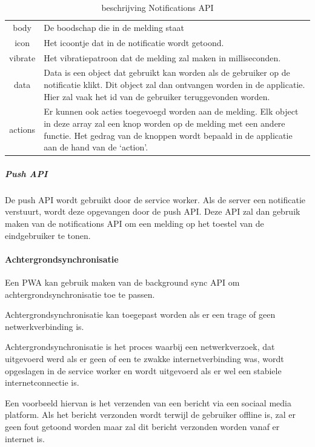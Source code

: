 			\begin{table}[H]
				\centering
				\begin{tabular}{cp{12cm}}
			       body & De boodschap die in de melding staat  \\
			       icon & Het icoontje dat in de notificatie wordt getoond. \\
			       vibrate & Het vibratiepatroon dat de melding zal maken in milliseconden. \\
			       data & Data is een object dat gebruikt kan worden als de gebruiker op de notificatie  klikt. Dit object zal dan ontvangen worden in de applicatie. Hier zal vaak het id van de gebruiker teruggevonden worden. \\
			       actions & Er kunnen ook acties toegevoegd worden aan de melding. Elk object in deze array zal een knop worden op de melding met een andere functie. Het gedrag van de knoppen wordt bepaald in de applicatie aan de hand van de ‘action’. \\
				\end{tabular}	
				\caption{beschrijving Notifications API}
			\end{table}
			\autocite{Developers2019}
			\autocite{Mozilla2019a}
		
		
		\subparagraph{Push API}
		
			De push API wordt gebruikt door de service worker. Als de server een notificatie verstuurt, wordt deze opgevangen door de push API. Deze API zal dan gebruik maken van de notifications API om een melding op het toestel van de eindgebruiker te tonen.
			\autocite{Mozilla2019b}
			\autocite{Gaunt2020}
	
	\paragraph{Achtergrondsynchronisatie }
		Een PWA kan gebruik maken van de background sync API om achtergrondsynchronisatie toe te passen.
		
		Achtergrondsynchronisatie kan toegepast worden als er een trage of geen netwerkverbinding is. 
		
		Achtergrondsynchronisatie is het proces waarbij een netwerkverzoek, dat uitgevoerd werd als er geen of een te zwakke internetverbinding was, wordt opgeslagen in de service worker en wordt uitgevoerd als er wel een stabiele internetconnectie is.
		
		Een voorbeeld hiervan is het verzenden van een bericht via een sociaal media platform. Als het bericht verzonden wordt terwijl de gebruiker offline is, zal er geen fout getoond worden maar zal dit bericht verzonden worden vanaf er internet is.
		
